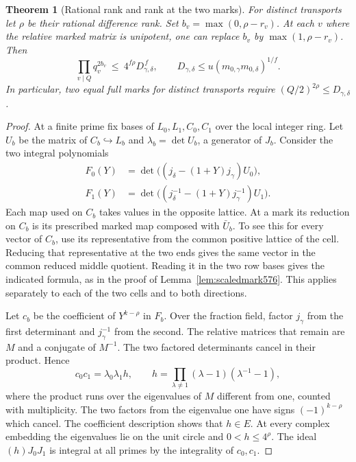 \documentclass[a4paper,11pt]{article}
\newtheorem{theorem}[proposition]{Theorem}
\theoremstyle{definition}
\theoremstyle{remark}
\numberwithin{equation}{section}
\begin{document}
\begin{theorem}[Rational rank and rank at the two marks]
\leavevmode\label{thm:rankmarks602}
For distinct transports let \(\rho\) be their rational
difference rank. Set \(b_v=\max(0,\rho-r_v)\).
At each \(v\) where the relative marked matrix is unipotent,
one can replace \(b_v\) by \(\max(1,\rho-r_v)\). Then
\[
     \prod_{v\mid Q}q_v^{2b_v}
       \ \le\ 4^{f\rho}D_{\gamma,\delta}^{\,f},\qquad
     D_{\gamma,\delta}\le u(m_{0,\gamma}m_{0,\delta})^{1/f}.
\]
In particular, two equal full marks for distinct transports
require \((Q/2)^{2\rho}\le D_{\gamma,\delta}\).
\end{theorem}
\begin{proof}
At a finite prime fix bases of \(L_0,L_1,C_0,C_1\) over the
local integer ring. Let \(U_b\) be the matrix of
\(C_b\hookrightarrow L_b\) and \(\lambda_b=\det U_b\), a
generator of \(J_b\). Consider the two integral polynomials
\[
 \begin{split}
   F_0(Y)&=\det\bigl((j_\delta-(1+Y)j_\gamma)U_0\bigr),\\
   F_1(Y)&=\det\bigl((j_\delta^{-1}-(1+Y)j_\gamma^{-1})U_1\bigr).
 \end{split}
\]
Each map used on \(C_b\) takes values in the opposite lattice.
At a mark its reduction on \(C_b\) is its prescribed marked
map composed with \(\bar U_b\). To see this for every vector of
\(C_b\), use its representative from the common positive lattice
of the cell. Reducing that representative at the two ends gives
the same vector in the common reduced middle quotient. Reading
it in the two row bases gives the indicated formula, as in
the proof of Lemma~\ref{lem:scaledmark576}. This applies
separately to each of the two cells and to both directions.

Let \(c_b\) be the coefficient of \(Y^{k-\rho}\) in \(F_b\).
Over the fraction field, factor \(j_\gamma\) from the first
determinant and \(j_\gamma^{-1}\) from the second. The relative
matrices that remain are \(M\) and a conjugate of \(M^{-1}\).
The two factored determinants cancel in their product. Hence
\[
 c_0c_1=\lambda_0\lambda_1 h,\qquad
 h=\prod_{\lambda\ne1}(\lambda-1)(\lambda^{-1}-1),
\]
where the product runs over the eigenvalues of \(M\) different
from one, counted with multiplicity. The two factors from the
eigenvalue one have signs \((-1)^{k-\rho}\) which cancel.
The coefficient description shows that \(h\in E\).
At every complex embedding the eigenvalues lie on the unit
circle and \(0<h\le4^\rho\). The ideal \((h)J_0J_1\) is
integral at all primes by the integrality of \(c_0,c_1\).


\end{proof}
\end{document}
